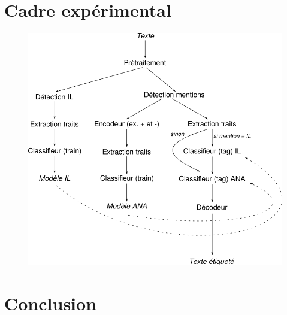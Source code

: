 \documentclass[a4paper,12pt]{article}
\begin{document}
\color{black}

\section{Cadre expérimental}

\begin{figure}[!h]
\centering
  \includegraphics[scale=0.6]{etapes.png}
\end{figure}

\section*{Conclusion}





\end{document}
